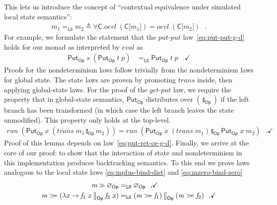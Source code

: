 \documentclass{llncs}
\newcommand{\Conid}[1]{\mathit{#1}}
\newcommand{\Varid}[1]{\mathit{#1}}
\let\Varid\mathit
\let\Conid\mathsf
\begin{document}
This lets us introduce the concept of ``contextual equivalence under simulated
local state semantics'':
\newcommand{\CEqLS}{=_\mathtt{LS}}
\begin{align*}
  \ensuremath{\Varid{m}_{1}} \CEqLS \ensuremath{\Varid{m}_{2}} \triangleq \forall \ensuremath{\Conid{C}}. \ensuremath{\Varid{oevl}\;(\Conid{C}\lbrack\Varid{m}_{1}\rbrack)} = \ensuremath{\Varid{oevl}\;(\Conid{C}\lbrack\Varid{m}_{2}\rbrack)} \mbox{~~.}
\end{align*}
For example, we formulate the statement that the \ensuremath{\Varid{put}}-\ensuremath{\Varid{put}}
law~\eqref{eq:put-put-g-d} holds for our monad as interpreted by \ensuremath{\Varid{eval}} as
\begin{align*}
  \ensuremath{\Conid{Put}_\Conid{Op}\;\Varid{s}\;(\Conid{Put}_\Conid{Op}\;\Varid{t}\;\Varid{p})} &\CEqLS \ensuremath{\Conid{Put}_\Conid{Op}\;\Varid{t}\;\Varid{p}} \mbox{~~.} \checkmark
\end{align*}
Proofs for the nondeterminism laws follow trivially from the nondeterminism laws
for global state.
The state laws are proven by promoting \ensuremath{\Varid{trans}} inside, then applying
global-state laws.
For the proof of the \ensuremath{\Varid{get}}-\ensuremath{\Varid{put}} law, we require the property that in
global-state semantics, \ensuremath{\Conid{Put}_\Conid{Op}} distributes over \ensuremath{(\talloblong_\Conid{Op})} if the left branch
has been transformed (in which case the left branch leaves the state unmodified).
This property only holds at the top-level.
\begin{align}
\ensuremath{\Varid{run}\;(\Conid{Put}_\Conid{Op}\;\Varid{x}\;(\Varid{trans}\;\Varid{m}_{1}\mathbin{\talloblong}_\Conid{Op}\Varid{m}_{2}))} = \ensuremath{\Varid{run}\;(\Conid{Put}_\Conid{Op}\;\Varid{x}\;(\Varid{trans}\;\Varid{m}_{1})\mathbin{\talloblong}_\Conid{Op}\Conid{Put}_\Conid{Op}\;\Varid{x}\;\Varid{m}_{2})} \label{eq:put-ret-mplus-g}\mbox{~~.} \checkmark
\end{align}
Proof of this lemma depends on law~\eqref{eq:put-ret-or-g-d}.
Finally, we arrive at the core of our proof:
to show that the interaction of state and nondeterminism in this
implementation produces backtracking semantics.
To this end we prove laws analogous to the local state laws
\eqref{eq:mplus-bind-dist} and \eqref{eq:mzero-bind-zero}
\begin{align}
  \ensuremath{\Varid{m}\mathbin{\hstretch{0.7}{>\!\!>}}\Varid{\varnothing}_\Conid{Op}}                      &\CEqLS \ensuremath{\Varid{\varnothing}_\Conid{Op}} \mbox{~~,} \label{eq:mplus-bind-zero-l} \checkmark \\
  \ensuremath{\Varid{m}\mathrel{\hstretch{0.7}{>\!\!>\!\!=}}(\lambda \Varid{x}\to \Varid{f}_{1}\;\Varid{x}\mathbin{\talloblong}_\Conid{Op}\Varid{f}_{2}\;\Varid{x})} &\CEqLS \ensuremath{(\Varid{m}\mathrel{\hstretch{0.7}{>\!\!>\!\!=}}\Varid{f}_{1})\mathbin{\talloblong}_\Conid{Op}(\Varid{m}\mathrel{\hstretch{0.7}{>\!\!>\!\!=}}\Varid{f}_{2})} \mbox{~~.} \checkmark \label{eq:mplus-bind-dist-l}
\end{align}
\end{document}
